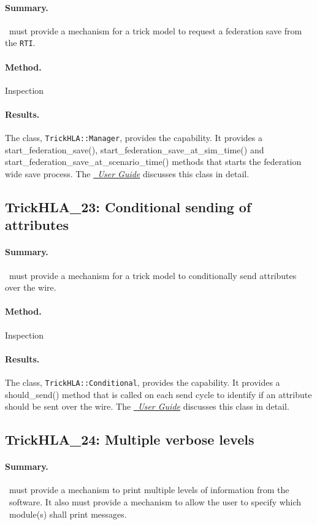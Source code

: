 \paragraph{Summary.}
\TrickHLA\ must provide a mechanism for a trick model to request a federation
save from the {\tt RTI}.
\paragraph{Method.} Inspection
\paragraph{Results.}
The class, {\tt TrickHLA::Manager}, provides the capability. It
provides a start\_federation\_save(), start\_federation\_save\_at\_sim\_time() and
start\_federation\_save\_at\_scenario\_time() methods that starts the federation
wide save process.
The \href{file:TrickHLAUser.pdf} {\em \TrickHLA\ User Guide}
discusses this class in detail.

\subsection{TrickHLA\_23: Conditional sending of attributes}
\paragraph{Summary.}
\TrickHLA\ must provide a mechanism for a trick model to conditionally send
attributes over the wire.
\paragraph{Method.} Inspection
\paragraph{Results.}
The class, {\tt TrickHLA::Conditional}, provides the capability. It provides a
should\_send() method that is called on each send cycle to identify if an
attribute should be sent over the wire.
The \href{file:TrickHLAUser.pdf} {\em \TrickHLA\ User Guide}
discusses this class in detail.

\subsection{TrickHLA\_24: Multiple verbose levels}
\paragraph{Summary.}
\TrickHLA\ must provide a mechanism to print multiple levels of information from
the \TrickHLA\ software. It also must provide a mechanism to allow the user to
specify which \TrickHLA\ module(s) shall print messages.
